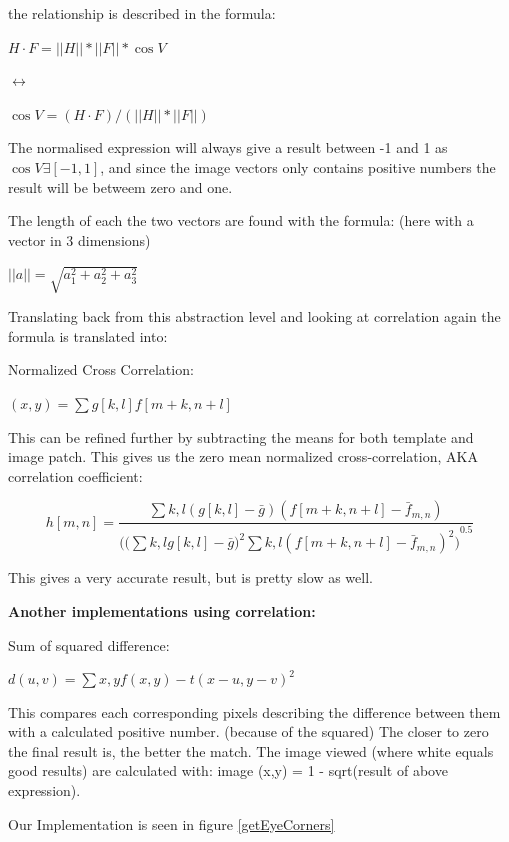 the relationship is described in the formula:

$H \cdot F = ||H|| * ||F|| * \cos{V}$

\begin{center} 
$\leftrightarrow$
\end{center}

$\cos{V} = (H \cdot F) /(||H|| * ||F||)$

The normalised expression will always give a result between -1 and 1 as
$\cos{V} \exists [-1,1]$, and since the image vectors only contains
positive numbers the result will be betweem zero and one.

The length of each the two vectors are found with the formula: (here
with a vector in 3 dimensions)

$||a|| = \sqrt{a_1^2 + a_2^2 + a_3^2}$

Translating back from this abstraction level and looking at correlation
again the formula is translated into:

Normalized Cross Correlation:

$(x,y) = \sum{g[k,l] f[m+k,n+l]}$

This can be refined further by subtracting the means for both template
and image patch. This gives us the zero mean normalized
cross-correlation, AKA correlation coefficient:

\[h[m,n] = \frac{ \sum{k,l}{(g[k,l]-\bar{g})(f[m+k,n+l]-\bar{f}_{m,n})}}{((\sum{k,l}{g[k,l]-\bar{g})^2\sum{k,l}{(f[m+k,n+l]-\bar{f}_{m,n})^2)}^{0.5}}}\]

This gives a very accurate result, but is pretty slow as well.

\textbf{Another implementations using correlation:}

Sum of squared difference:

$d(u,v)=\sum{x,y}{f(x,y)-t(x-u,y-v)}^2$

This compares each corresponding pixels describing the difference
between them with a calculated positive number. (because of the squared)
The closer to zero the final result is, the better the match. The image
viewed (where white equals good results) are calculated with: image
(x,y) = 1 - sqrt(result of above expression).

Our Implementation is seen in figure \ref{getEyeCorners}

